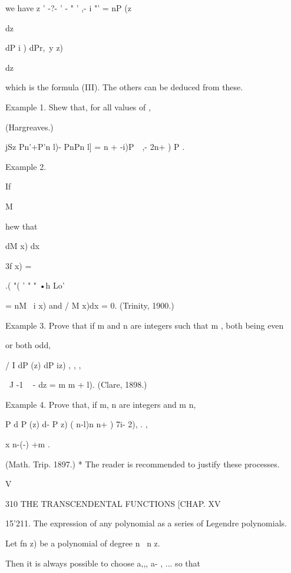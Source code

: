 {we have z ' -?- ' - " '  ,- i "' = nP  (z\ 

dz   



dP i ) dPr,\ y z) 

dz 



which is the formula (III). The others can be deduced from these. 



Example 1. Shew that, for all values of  , 

(Hargreaves.) 



jSz Pn'+P'n l)- PnPn l] =   n + -i)P\ \  ,- 2n+ ) P . 



Example 2. 


If 


M 


hew that 




dM  x) 
dx 



3f  x) = 



.( "(  ' " " •h Lo' 



= nM \ i x) and / M  x)dx = 0. (Trinity, 1900.) 



Example 3. Prove that if m and n are integers such that m    , both being even 

or both odd, 

/ I dP (z) dP iz) , , , 

\ J -1 ~  - dz = m m + l). (Clare, 1898.) 

Example 4. Prove that, if m, n are integers and m   n, 

P d P (z) d- P  z) ( n-l)n n+  )  7i- 2),  .       , 

x n-(-) +m . 

(Math. Trip. 1897.) 
* The reader is recommended to justify these processes. 



V 



310 THE TRANSCENDENTAL FUNCTIONS [CHAP. XV 

15'211. The expression of any polynomial as a series of Legendre 
polynomials. 

Let fn  z) be a polynomial of degree n \ n z. 

Then it is always possible to choose a,,, a- , ...    so that 

}
